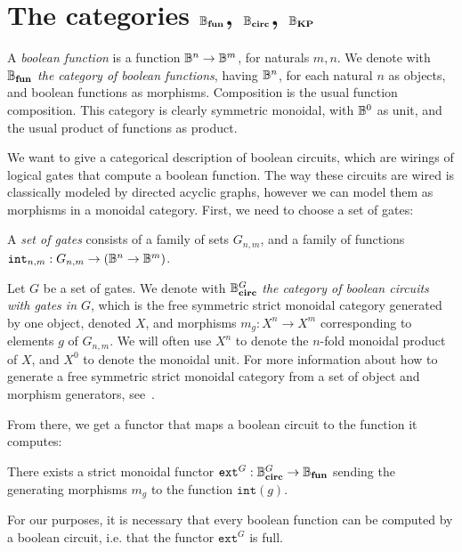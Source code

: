 \documentclass[preliminary,copyright,creativecommons,sharealike,noncommercial]{eptcs}
\begin{document}
\section[The categories Bfun, Bcirc, Bkp]{The categories $\mathbb{B}_\textbf{fun}$, $\mathbb{B}_\textbf{circ}$, $\mathbb{B}_\textbf{KP}$}
\label{sec: the categories bfun, bcirc, bkp}
%
%
\begin{definition}
  A \emph{boolean function} is a function $\mathbb{B}^n \to \mathbb{B}^m$, for naturals $m,
  n$. We denote with $\mathbb{B}_\textbf{fun}$ \emph{the category of boolean functions}, having
  $\mathbb{B}^n$, for each natural $n$ as objects, and boolean functions as
  morphisms. Composition is the usual function composition. This category is
  clearly symmetric monoidal, with $\mathbb{B}^0$ as unit, and the usual product of
  functions as product.
\end{definition}
%
We want to give a categorical description of boolean circuits, which are wirings
of logical gates that compute a boolean function. The way these circuits are
wired is classically modeled by directed acyclic graphs, however we can model
them as morphisms in a monoidal category. First, we need to choose a set of
gates:
%
\begin{definition}
  A \emph{set of gates} consists of a family of sets $G_{n,m}$, and a family of
  functions $\texttt{int}_{n,m} : G_{n,m} \to (\mathbb{B}^n \to \mathbb{B}^m)$.
\end{definition}
%
\begin{definition}
  Let $G$ be a set of gates. We denote with $\mathbb{B}_\textbf{circ}^G$ \emph{the category of
    boolean circuits with gates in $G$}, which is the free symmetric strict
  monoidal category generated by one object, denoted $X$, and morphisms $m_g :
  X^n \to X^m$ corresponding to elements $g$ of $G_{n,m}$. We will often use $X^n$
  to denote the $n$-fold monoidal product of $X$, and $X^0$ to denote the
  monoidal unit. For more information about how to generate a free symmetric
  strict monoidal category from a set of object and morphism generators,
  see~\cite{Genovese2019}.
\end{definition}
%
%
From there, we get a functor that maps a boolean circuit to the function it computes:
%
%
\begin{lemma}\label{lem: monoidal functor Bcirc Bfun}
  There exists a strict monoidal functor $\texttt{ext}^G: \mathbb{B}_\textbf{circ}^G \to \mathbb{B}_\textbf{fun}$ sending
  the generating morphisms $m_g$ to the function $\texttt{int}(g)$.
\end{lemma}
%
For our purposes, it is necessary that every boolean function can be computed by
a boolean circuit, i.e. that the functor $\texttt{ext}^G$ is full.
\end{document}
